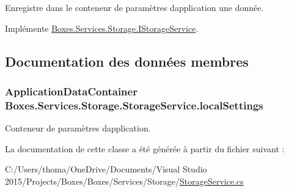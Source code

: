 Enregistre dans le conteneur de paramètres d\textquotesingle{}application une donnée.  



Implémente \hyperlink{interface_boxes_1_1_services_1_1_storage_1_1_i_storage_service_a2d6796200cdd63b0a6b5ed55819978b8}{Boxes.\+Services.\+Storage.\+I\+Storage\+Service}.



\subsection{Documentation des données membres}
\subsubsection[{\texorpdfstring{local\+Settings}{localSettings}}]{\setlength{\rightskip}{0pt plus 5cm}Application\+Data\+Container Boxes.\+Services.\+Storage.\+Storage\+Service.\+local\+Settings\hspace{0.3cm}{\ttfamily [private]}}\hypertarget{class_boxes_1_1_services_1_1_storage_1_1_storage_service_a6858aca239e79beeda3ef7e6da6c5f61}{}\label{class_boxes_1_1_services_1_1_storage_1_1_storage_service_a6858aca239e79beeda3ef7e6da6c5f61}


Conteneur de paramètres d\textquotesingle{}application. 



La documentation de cette classe a été générée à partir du fichier suivant \+:\begin{DoxyCompactItemize}
\item 
C\+:/\+Users/thoma/\+One\+Drive/\+Documents/\+Visual Studio 2015/\+Projects/\+Boxes/\+Boxes/\+Services/\+Storage/\hyperlink{_storage_service_8cs}{Storage\+Service.\+cs}\end{DoxyCompactItemize}
